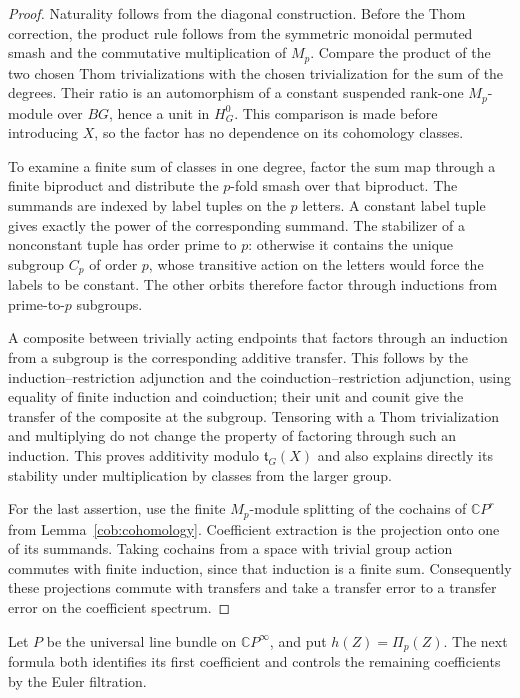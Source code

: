 \begin{proof}
 Naturality follows from the diagonal construction.  Before the Thom
 correction, the product rule follows from the symmetric monoidal
 permuted smash and the commutative multiplication of $M_p$.
 Compare the product of the two chosen Thom trivializations with the
 chosen trivialization for the sum of the degrees.  Their ratio is
 an automorphism of a constant suspended rank-one $M_p$-module over
 $BG$, hence a unit in $H_G^0$.  This comparison is made before
 introducing $X$, so the factor has no dependence on its
 cohomology classes.

 To examine a finite sum of classes in one degree, factor the sum
 map through a finite biproduct and distribute the $p$-fold smash
 over that biproduct.  The summands are indexed by label tuples on
 the $p$ letters.  A constant label tuple gives exactly the power
 of the corresponding summand.  The stabilizer of a nonconstant
 tuple has order prime to $p$: otherwise it contains the unique
 subgroup $C_p$ of order $p$, whose transitive action on the letters
 would force the labels to be constant.  The other orbits therefore
 factor through inductions from prime-to-$p$ subgroups.

 A composite between trivially acting endpoints that factors through
 an induction from a subgroup is the corresponding additive transfer.
 This follows by the induction--restriction adjunction and the
 coinduction--restriction adjunction, using equality of finite
 induction and coinduction; their unit and counit give the transfer
 of the composite at the subgroup.  Tensoring with a Thom
 trivialization and multiplying do not change the property of
 factoring through such an induction.  This proves additivity
 modulo $\mathfrak t_G(X)$ and also explains directly its stability
 under multiplication by classes from the larger group.

 For the last assertion, use the finite $M_p$-module splitting of
 the cochains of $\mathbb CP^r$ from Lemma~\ref{cob:cohomology}.
 Coefficient extraction is the projection onto one of its summands.
 Taking cochains from a space with trivial group action commutes
 with finite induction, since that induction is a finite sum.
 Consequently these projections commute with transfers and take
 a transfer error to a transfer error on the coefficient spectrum.
\end{proof}

Let $P$ be the universal line bundle on $\mathbb CP^\infty$, and put
$h(Z)=\Pi_p(Z)$.  The next formula both identifies its first
coefficient and controls the remaining coefficients by the
Euler filtration.

